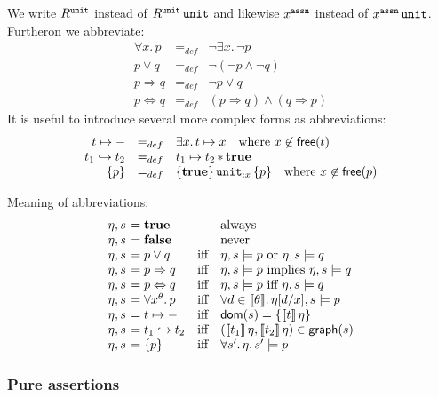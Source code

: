 \documentclass[12pt,a4paper]{article}
\begin{document}
We write $R^{\mathtt{unit}}$ instead of $R^{\mathtt{unit}}\,\mathtt{unit}$ and likewise $x^{\tassn}$ instead of $\app{x^{\tassn}}{\unit}$.
Furtheron we abbreviate:
\[\begin{array}{rcl}
  \forall x.\,p &=_{def}& \neg \exists x.\,\neg p \\
  p \vee q &=_{def}& \neg (\neg p \wedge \neg q) \\
  p \Rightarrow q &=_{def}& \neg p \vee q \\
  p \Leftrightarrow q &=_{def}& (p \Rightarrow q) \wedge (q \Rightarrow p)
\end{array}\]
It is useful to introduce several more complex forms as abbreviations:
\[\begin{array}{rcl}
  t \mapsto - &=_{def}& \exists x.\,t \mapsto x \quad \text{where $x\not\in\mathsf{free}(t)$} \\
  t_1 \hookrightarrow t_2 &=_{def}& t_1 \mapsto t_2 \operatorname{\ast} \mathbf{true} \\
  \{p\} &=_{def}& \{\mathbf{true}\}\,{\mathtt{unit}}_{:{x}}\,\{p\} \quad \text{where $x\not\in\mathsf{free}(p)$}
\end{array}\]

Meaning of abbreviations:
\[\begin{array}{lcl}
  \eta,s \models \mathbf{true}
  && \text{always} \\
  \eta,s \models \mathbf{false}
  && \text{never} \\
  \eta,s \models p \vee q
  &\text{iff}& \eta,s \models p \text{ or } \eta,s \models q \\
  \eta,s \models p \Rightarrow q
  &\text{iff}& \eta,s \models p \text{ implies } \eta,s \models q \\
  \eta,s \models p \Leftrightarrow q
  &\text{iff}& \eta,s \models p \text{ iff } \eta,s \models q \\
  \eta,s \models \forall x^\theta.\,p
  &\text{iff}& \forall d\in \llbracket\theta\rrbracket.\,\eta[d/x],s \models p \\
  \eta,s \models t \mapsto -
  &\text{iff}& \mathsf{dom}(s) = \{\llbracket t\rrbracket\,\eta\} \\
  \eta,s \models t_1 \hookrightarrow t_2
  &\text{iff}& (\llbracket t_1\rrbracket\,\eta,\llbracket t_2\rrbracket\,\eta)\in\mathsf{graph}(s) \\
  \eta,s \models \{p\}
  &\text{iff}& \forall s'.\,\eta,s' \models p
\end{array}\]

\subsubsection{Pure assertions}
\end{document}
